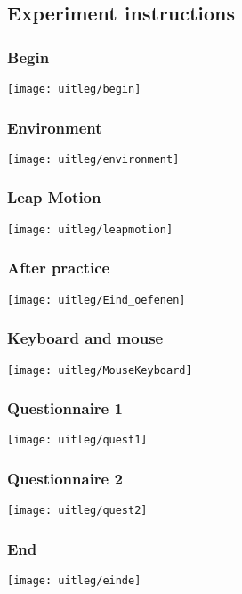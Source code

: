 \subsection{Experiment instructions}\label{app:instructions}

\subsubsection{Begin}
\texttt{[image: uitleg/begin]}

\subsubsection{Environment}
\texttt{[image: uitleg/environment]}

\subsubsection{Leap Motion}
\texttt{[image: uitleg/leapmotion]}

\subsubsection{After practice}
\texttt{[image: uitleg/Eind\_oefenen]}

\subsubsection{Keyboard and mouse}
\texttt{[image: uitleg/MouseKeyboard]}

\subsubsection{Questionnaire 1}
\texttt{[image: uitleg/quest1]}

\subsubsection{Questionnaire 2}
\texttt{[image: uitleg/quest2]}

\subsubsection{End}
\texttt{[image: uitleg/einde]}